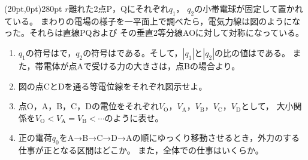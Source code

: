 \hakosyokika
\item
    \begin{mawarikomi}(20pt,0pt){280pt}{}
           $r$離れた2点P，Qにそれぞれ$q_1$，
           $q_2$の小帯電球が固定して置かれている。
           まわりの電場の様子を一平面上で調べたら，電気力線は図のようになった。それらは直線PQおよび
           その垂直2等分線AOに対して対称になっている。
        \begin{enumerate}
            \item $q_1$の符号は\Hako で，$q_2$の符号は\Hako である。そして，$|q_1|$と$|q_2|$の比の値は\Hako である。
            また，帯電体が点Aで受ける力の大きさは，点Bの場合より\Hako 。
            \item 図の点CとDを通る等電位線をそれぞれ図示せよ。
            \item 点O，A，B，C，Dの電位をそれぞれ$V_\mathrm{O}$，$V_\mathrm{A}$，$V_\mathrm{B}$，$V_\mathrm{C}$，$V_\mathrm{D}$として，
            大小関係を$V_\mathrm{O}<V_\mathrm{A}=V_\mathrm{B}<\cdots $のように表せ。
            \item 正の電荷$q_0$をA→B→C→D→Aの順にゆっくり移動させるとき，外力のする仕事が正となる区間はどこか。
            また，全体での仕事はいくらか。
        \end{enumerate}
    \end{mawarikomi}
